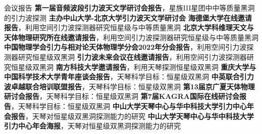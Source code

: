 
\begin{rubric}{会议报告}
	\entry*[2024] \textbf{第一届音频波段引力波天文学研讨会报告}，星族III星团中中等质量黑洞的引力波探测
	\entry*[2023] \textbf{主办中山大学-北京大学引力波天文学研讨会}
	\entry*[2023] \textbf{海德堡大学在线邀请报告}，利用空间引力波探测器研究恒星级与中等质量黑洞
	\entry*[2023] \textbf{北京大学科维理天文与天体物理研究所在线邀请报告}，利用空间引力波探测器研究恒星级与中等质量黑洞
	\entry*[2022] \textbf{中国物理学会引力与相对论天体物理学分会2022年分会报告}，利用空间引力波探测器研究恒星级双黑洞
	\entry*[2022] \textbf{引力波未来会议在线邀请报告}，利用空间引力波探测器研究恒星级双黑洞
	\entry*[2022] \textbf{南方科技大学邀请报告}，利用天琴探测恒星级双黑洞
	\entry*[2021] \textbf{重庆大学与中国科学技术大学青年座谈会报告}，天琴科学目标：恒星级双黑洞
	\entry*[2021] \textbf{中英联合引力波卓越联合培训联盟报告}，天琴科学目标：恒星级双黑洞
	\entry*[2020] \textbf{第13届京广夏天体物理研讨会报告}，天琴科学目标：恒星级双黑洞
	\entry*[2020] \textbf{第7届KAGRA国际在线研讨会报告}，天琴科学目标：恒星级双黑洞
	\entry*[2019] \textbf{中山大学天琴中心与华中科技大学引力中心年会报告}，天琴对恒星级双黑洞探测能力的研究
	\entry*[2018] \textbf{中山大学天琴中心与华中科技大学引力中心年会海报}，天琴对恒星级双黑洞探测能力的研究
\end{rubric}
